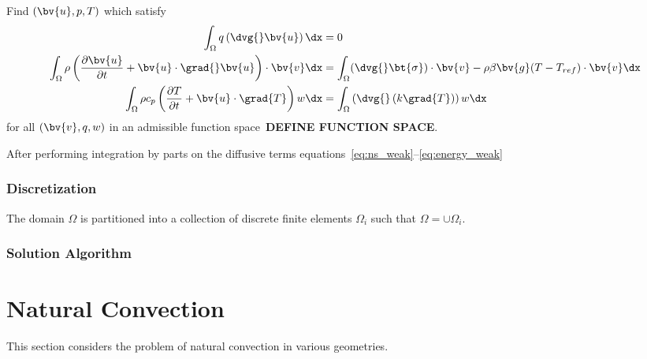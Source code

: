 Find $(\bv{u}, p, T)$ which satisfy
\begin{align}
  \label{eq:cont_weak}
  \int_\Omega q \left(\dvg{}\bv{u}\right) \dx &= 0 \\
  \label{eq:ns_weak}
  \int_\Omega \rho\left(
    \frac{\partial \bv{u}}{\partial t} + \bv{u} \cdot \grad{}\bv{u}
  \right) \cdot \bv{v} \dx & =
  \int_\Omega (\dvg{}\bt{\sigma})\cdot\bv{v}
  - \rho \beta \bv{g}(T-T_{ref})\cdot\bv{v} \dx \\
  \label{eq:energy_weak}
  \int_\Omega \rho c_p \left(
    \frac{\partial T}{\partial t} + \bv{u} \cdot \grad{T}
  \right) w \dx &=
  \int_\Omega \left(\dvg{} \left(k \grad{T}\right)\right) w \dx
\end{align}
for all $(\bv{v}, q, w)$ in an admissible function space~\textbf{DEFINE FUNCTION SPACE}.

After performing integration by parts on the diffusive terms equations~\eqref{eq:ns_weak}--\eqref{eq:energy_weak} 
  
\subsubsection{Discretization}
The domain $\Omega$ is partitioned into a collection of discrete finite elements $\Omega_i$ such that $\Omega=\cup \Omega_i$.  

\subsubsection{Solution Algorithm}

\section{Natural Convection}
This section considers the problem of natural convection in various geometries. 



